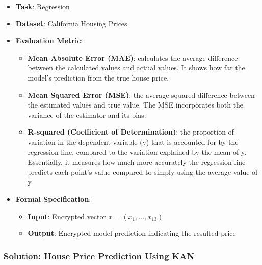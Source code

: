 \documentclass[article]{iacrtrans}
\begin{document}
\begin{itemize}
    \item \textbf{Task}: Regression
    \item \textbf{Dataset}: California Housing Prices
    \item \textbf{Evaluation Metric}:
        \begin{itemize}
            \item \textbf{Mean Absolute Error (MAE)}: calculates the average difference between the calculated values and actual values. It shows how far the model’s prediction from the true house price.
            \item \textbf{Mean Squared Error (MSE)}: the average squared difference between the estimated values and true value. The MSE incorporates both the variance of the estimator and its bias.
            \item \textbf{R-squared (Coefficient of Determination)}: the proportion of variation in the dependent variable (y) that is accounted for by the regression line, compared to the variation explained by the mean of y. Essentially, it measures how much more accurately the regression line predicts each point’s value compared to simply using the average value of y.
        \end{itemize}
    \item \textbf{Formal Specification}: 
        \begin{itemize}
            \item \textbf{Input}: Encrypted vector \(x = (x_1, ..., x_{13})\)
            \item \textbf{Output}: Encrypted model prediction indicating the resulted price
        \end{itemize}
\end{itemize}

\subsubsection{Solution: House Price Prediction Using KAN}
\end{document}
